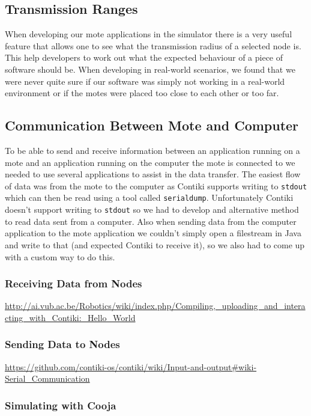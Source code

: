 \subsection{Transmission Ranges}
When developing our mote applications in the simulator there is a very useful feature that allows one to see what the transmission radius of a selected node is. This help developers to work out what the expected behaviour of a piece of software should be. When developing in real-world scenarios, we found that we were never quite sure if our software was simply not working in a real-world environment or if the motes were placed too close to each other or too far.

\subsection{Communication Between Mote and Computer}
To be able to send and receive information between an application running on a mote and an application running on the computer the mote is connected to we needed to use several applications to assist in the data transfer. The easiest flow of data was from the mote to the computer as Contiki supports writing to \verb|stdout| which can then be read using a tool called \verb|serialdump|. Unfortunately Contiki doesn't support writing to \verb|stdout| so we had to develop and alternative method to read data sent from a computer. Also when sending data from the computer application to the mote application we couldn't simply open a filestream in Java and write to that (and expected Contiki to receive it), so we also had to come up with a custom way to do this.

\subsubsection{Receiving Data from Nodes}

\url{http://ai.vub.ac.be/Robotics/wiki/index.php/Compiling,_uploading_and_interacting_with_Contiki:_Hello_World}

\subsubsection{Sending Data to Nodes}

\url{https://github.com/contiki-os/contiki/wiki/Input-and-output#wiki-Serial_Communication}


\subsubsection{Simulating with Cooja}

